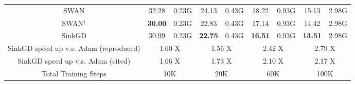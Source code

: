 \begin{table*}[t!]
\begin{tabular}{|c|cc|cc|cc|cc|}
    
    SWAN &  32.28 &0.23G& 24.13 &0.43G& 18.22 &0.93G& 15.13& 2.98G \\

    SWAN$^\dag$ &  \textbf{30.00} &0.23G& 22.83 &0.43G& 17.14 &0.93G& 14.42& 2.98G \\
    
    \midrule
    SinkGD & $30.99$ & 0.23G & \textbf{22.75} &0.43G &  
    \textbf{16.51} &0.93G & \textbf{13.51}  &2.98G \\
    \bottomrule
    SinkGD speed up v.s. Adam (reproduced) & \multicolumn{2}{c|}{1.60 X} & \multicolumn{2}{c|}{1.56 X} & \multicolumn{2}{c|}{2.42 X} & \multicolumn{2}{c|}{2.79 X} \\
    SinkGD speed up v.s. Adam (cited) & \multicolumn{2}{c|}{1.66 X} & \multicolumn{2}{c|}{1.73 X} & \multicolumn{2}{c|}{2.10 X} & \multicolumn{2}{c|}{2.17 X} \\
    Total Training Steps & \multicolumn{2}{c|}{10K} & \multicolumn{2}{c|}{20K} & \multicolumn{2}{c|}{60K} & \multicolumn{2}{c|}{100K}  \\ 
    \bottomrule
    \end{tabular}
\end{table*}


\begin{table}[H]
\vspace{-0.5cm}
\centering
\caption{Comparison of the test perplexities obtained during training when training 1B LLaMA with SinkGD v.s. 7B LLaMA using different baselines. For Apollo, Apollo-mini, 8-bit Adam and Galore, we cite the number from \citet{zhu2024apollo}.}
\label{tab: 7B preformance}
\end{table}

